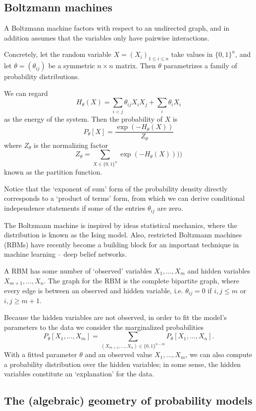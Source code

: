 \documentclass[12pt]{article}
\begin{document}
\subsection{Boltzmann machines}

A Boltzmann machine factors with respect to an undirected graph, and in addition
assumes that the variables only have pairwise interactions.

Concretely, let the random variable $X = (X_i)_{1 \le i \le n}$ take values in
$\{0,1\}^n$, and let $\theta = (\theta_{ij})$ be a symmetric $n \times n$
matrix.  Then $\theta$ parametrizes a family of probability distributions.

We can regard 
\[
    H_\theta(X) = \sum_{i < j} \theta_{ij} X_i X_j + \sum_i \theta_i X_i
\]
as the energy of the system.  Then the probability of $X$ is
\[
    P_\theta[X] = \frac{\exp(- H_\theta(X))}{Z_\theta}
\]
where $Z_\theta$ is the normalizing factor
\[
    Z_\theta = \sum_{X \in \{0,1\}^n} \exp(-H_\theta(X))))
\]
known as the partition function.

Notice that the `exponent of sum' form of the probability density directly
corresponds to a `product of terms' form, from which we can derive conditional
independence statements if some of the entries $\theta_{ij}$ are zero.

The Boltzmann machine is inspired by ideas statistical mechanics, where the
distribution is known as the Ising model.  Also, restricted Boltzmann machines
(RBMs) have recently become a building block for an important technique in
machine learning -- deep belief networks.

A RBM has some number of `observed' variables $X_1, \ldots, X_m$ and hidden
variables $X_{m+1}, \ldots, X_n$.  The graph for the RBM is the complete
bipartite graph, where every edge is between an observed and hidden variable,
i.e. $\theta_{ij} = 0$ if $i,j \le m$ or $i,j \ge m+1$.

Because the hidden variables are not observed, in order to fit the model's
parameters to the data we consider the marginalized probabilities
\[
    P_\theta[X_1, \ldots, X_m] = \sum_{(X_{m+1}, \ldots, X_n) \in \{0,1\}^{n-m}}
        P_\theta[X_1, \ldots, X_n].
\]
With a fitted parameter $\theta$ and an observed value $X_1, \ldots, X_m$, we can
also compute a probability distribution over the hidden variables; in some
sense, the hidden variables constitute an `explanation' for the data.


\subsection{The (algebraic) geometry of probability models}
\end{document}
